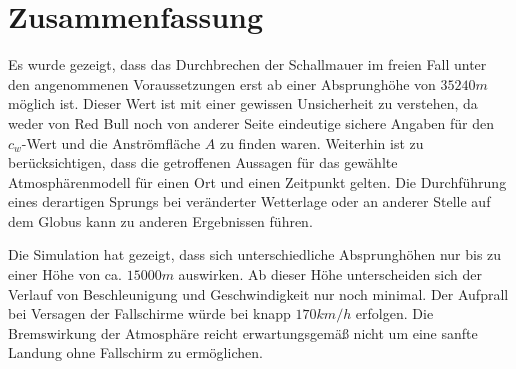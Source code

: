 \section{Zusammenfassung}\label{sec:schluss}

Es wurde gezeigt, dass das Durchbrechen der Schallmauer im freien Fall unter den angenommenen Voraussetzungen erst ab einer Absprunghöhe von $35240m$ möglich ist.
Dieser Wert ist mit einer gewissen Unsicherheit zu verstehen, da weder von Red Bull noch von anderer Seite eindeutige sichere Angaben für den $c_w$-Wert und die Anströmfläche $A$ zu finden waren.
Weiterhin ist zu berücksichtigen, dass die getroffenen Aussagen für das gewählte Atmosphärenmodell für einen Ort und einen Zeitpunkt gelten.
Die Durchführung eines derartigen Sprungs bei veränderter Wetterlage oder an anderer Stelle auf dem Globus kann zu anderen Ergebnissen führen.

Die Simulation hat gezeigt, dass sich unterschiedliche Absprunghöhen nur bis zu einer Höhe von ca. $15000m$ auswirken.
Ab dieser Höhe unterscheiden sich der Verlauf von Beschleunigung und Geschwindigkeit nur noch minimal.
Der Aufprall bei Versagen der Fallschirme würde bei knapp $170km/h$ erfolgen.
Die Bremswirkung der Atmosphäre reicht erwartungsgemäß nicht um eine sanfte Landung ohne Fallschirm zu ermöglichen.


\newpage
